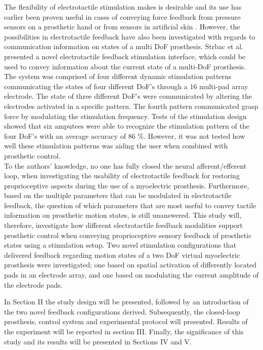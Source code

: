 %
The flexibility of electrotactile stimulation makes is desirable and its use has earlier been proven useful in cases of conveying force feedback from pressure sensors on a prosthetic hand or from sensors in artificial skin \cite{Hartmann2014,Franceschi2015}. However, the possibilities in electrotactile feedback have also been investigated with regards to communication information on states of a multi DoF prosthesis. Strbac et al. \cite{Strbac2016} presented a novel electrotactile feedback stimulation interface, which could be used to convey information about the current state of a multi-DoF prosthesis. The system was comprised of four different dynamic stimulation patterns communicating the states of four different DoF's through a 16 multi-pad array electrode. The state of three different DoF's were communicated by altering the electrodes activated in a specific pattern. The fourth pattern communicated grasp force by modulating the stimulation frequency. Tests of the stimulation design showed that six amputees were able to recognize the stimulation pattern of the four DoF's with an average accuracy of 86 \%. \cite{Strbac2016} However, it was not tested how well these stimulation patterns was aiding the user when combined with prosthetic control.  \\   
%
To the authors' knowledge, no one has fully closed the neural afferent/efferent loop, when investigating the usability of electrotactile feedback for restoring proprioceptive aspects during the use of a myoelectric prosthesis. Furthermore, based on the multiple parameters that can be modulated in electrotactile feedback, the question of which parameters that are most useful to convey tactile information on prosthetic motion states, is still unanswered. This study will, therefore, investigate how different electrotactile feedback modalities support prosthetic control when conveying proprioceptive sensory feedback of prosthetic states using a stimulation setup. Two novel stimulation configurations that delivered feedback regarding motion states of a two DoF virtual myoelectric prosthesis were investigated; one based on spatial activation of differently located pads in an electrode array, and one based on modulating the current amplitude of the electrode pads.

In Section II the study design will be presented, followed by an introduction of the two novel feedback configurations derived. Subsequently, the closed-loop prosthesis, control system and experimental protocol will presented. Results of the experiment will be reported in section III. Finally, the significance of this study and its results will be presented in Sections IV and V. 
















